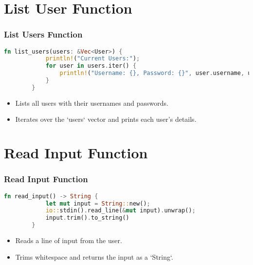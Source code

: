 \documentclass[aspectratio=169, table]{beamer}
\begin{document}
\section{List User Function}
\begin{frame}[fragile]
	\frametitle{List Users Function}
	\begin{lstlisting}[language=Rust]
		fn list_users(users: &Vec<User>) {
			println!("Current Users:");
			for user in users.iter() {
				println!("Username: {}, Password: {}", user.username, user.password);
			}
		}
	\end{lstlisting}
	\begin{itemize}
		\item Lists all users with their usernames and passwords.
		\item Iterates over the `users` vector and prints each user's details.
	\end{itemize}
\end{frame}

\section{Read Input Function}
\begin{frame}[fragile]
	\frametitle{Read Input Function}
	\begin{lstlisting}[language=Rust]
		fn read_input() -> String {
			let mut input = String::new();
			io::stdin().read_line(&mut input).unwrap();
			input.trim().to_string()
		}
	\end{lstlisting}
	\begin{itemize}
		\item Reads a line of input from the user.
		\item Trims whitespace and returns the input as a `String`.
	\end{itemize}
\end{frame}
\end{document}
